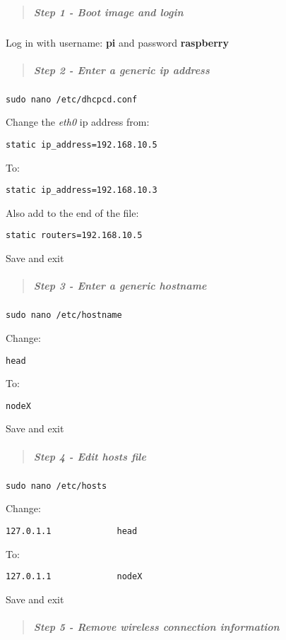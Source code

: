 \documentclass[]{article}
\let\oldsubparagraph\subparagraph
\renewcommand{\subparagraph}[1]{\oldsubparagraph{#1}\mbox{}}
\begin{document}
\begin{quote}
\mbox{}%
\subparagraph{Step 1 - Boot image and
login}\label{step-1---boot-image-and-login}
\end{quote}

Log in with username: \textbf{pi} and password \textbf{raspberry}

\begin{quote}
\mbox{}%
\subparagraph{Step 2 - Enter a generic ip
address}\label{step-2---enter-a-generic-ip-address}
\end{quote}

\texttt{sudo\ nano\ /etc/dhcpcd.conf}

Change the \emph{eth0} ip address from:

\texttt{static\ ip\_address=192.168.10.5}

To:

\texttt{static\ ip\_address=192.168.10.3}

Also add to the end of the file:

\texttt{static\ routers=192.168.10.5}

Save and exit

\begin{quote}
\mbox{}%
\subparagraph{Step 3 - Enter a generic
hostname}\label{step-3---enter-a-generic-hostname}
\end{quote}

\texttt{sudo\ nano\ /etc/hostname}

Change:

\texttt{head}

To:

\texttt{nodeX}

Save and exit

\begin{quote}
\mbox{}%
\subparagraph{Step 4 - Edit hosts file}\label{step-4---edit-hosts-file}
\end{quote}

\texttt{sudo\ nano\ /etc/hosts}

Change:

\texttt{127.0.1.1\ \ \ \ \ \ \ \ \ \ \ \ \ head}

To:

\texttt{127.0.1.1\ \ \ \ \ \ \ \ \ \ \ \ \ nodeX}

Save and exit

\begin{quote}
\mbox{}%
\subparagraph{Step 5 - Remove wireless connection
information}\label{step-5---remove-wireless-connection-information}
\end{quote}
\end{document}
